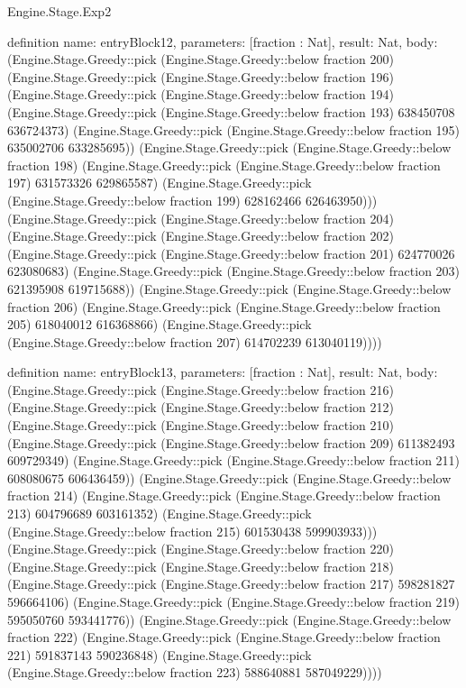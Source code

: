 \begin{lexlean}{Engine.Stage.Exp2}
\begin{semanticmodule}
definition{
  name: entryBlock12,
  parameters: [fraction : Nat],
  result: Nat,
  body: (Engine.Stage.Greedy::pick (Engine.Stage.Greedy::below fraction 200) (Engine.Stage.Greedy::pick (Engine.Stage.Greedy::below fraction 196) (Engine.Stage.Greedy::pick (Engine.Stage.Greedy::below fraction 194) (Engine.Stage.Greedy::pick (Engine.Stage.Greedy::below fraction 193) 638450708 636724373) (Engine.Stage.Greedy::pick (Engine.Stage.Greedy::below fraction 195) 635002706 633285695)) (Engine.Stage.Greedy::pick (Engine.Stage.Greedy::below fraction 198) (Engine.Stage.Greedy::pick (Engine.Stage.Greedy::below fraction 197) 631573326 629865587) (Engine.Stage.Greedy::pick (Engine.Stage.Greedy::below fraction 199) 628162466 626463950))) (Engine.Stage.Greedy::pick (Engine.Stage.Greedy::below fraction 204) (Engine.Stage.Greedy::pick (Engine.Stage.Greedy::below fraction 202) (Engine.Stage.Greedy::pick (Engine.Stage.Greedy::below fraction 201) 624770026 623080683) (Engine.Stage.Greedy::pick (Engine.Stage.Greedy::below fraction 203) 621395908 619715688)) (Engine.Stage.Greedy::pick (Engine.Stage.Greedy::below fraction 206) (Engine.Stage.Greedy::pick (Engine.Stage.Greedy::below fraction 205) 618040012 616368866) (Engine.Stage.Greedy::pick (Engine.Stage.Greedy::below fraction 207) 614702239 613040119))))
}

definition{
  name: entryBlock13,
  parameters: [fraction : Nat],
  result: Nat,
  body: (Engine.Stage.Greedy::pick (Engine.Stage.Greedy::below fraction 216) (Engine.Stage.Greedy::pick (Engine.Stage.Greedy::below fraction 212) (Engine.Stage.Greedy::pick (Engine.Stage.Greedy::below fraction 210) (Engine.Stage.Greedy::pick (Engine.Stage.Greedy::below fraction 209) 611382493 609729349) (Engine.Stage.Greedy::pick (Engine.Stage.Greedy::below fraction 211) 608080675 606436459)) (Engine.Stage.Greedy::pick (Engine.Stage.Greedy::below fraction 214) (Engine.Stage.Greedy::pick (Engine.Stage.Greedy::below fraction 213) 604796689 603161352) (Engine.Stage.Greedy::pick (Engine.Stage.Greedy::below fraction 215) 601530438 599903933))) (Engine.Stage.Greedy::pick (Engine.Stage.Greedy::below fraction 220) (Engine.Stage.Greedy::pick (Engine.Stage.Greedy::below fraction 218) (Engine.Stage.Greedy::pick (Engine.Stage.Greedy::below fraction 217) 598281827 596664106) (Engine.Stage.Greedy::pick (Engine.Stage.Greedy::below fraction 219) 595050760 593441776)) (Engine.Stage.Greedy::pick (Engine.Stage.Greedy::below fraction 222) (Engine.Stage.Greedy::pick (Engine.Stage.Greedy::below fraction 221) 591837143 590236848) (Engine.Stage.Greedy::pick (Engine.Stage.Greedy::below fraction 223) 588640881 587049229))))
}


\end{semanticmodule}
\end{lexlean}

